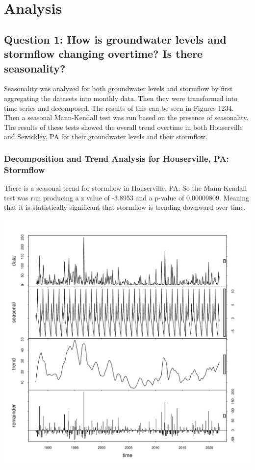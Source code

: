 \documentclass[
  12pt,
]{article}
\begin{document}
\newpage

\hypertarget{analysis}{%
\section{Analysis}\label{analysis}}

\hypertarget{question-1-how-is-groundwater-levels-and-stormflow-changing-overtime-is-there-seasonality}{%
\subsection{Question 1: How is groundwater levels and stormflow changing
overtime? Is there
seasonality?}\label{question-1-how-is-groundwater-levels-and-stormflow-changing-overtime-is-there-seasonality}}

Seasonality was analyzed for both groundwater levels and stormflow by
first aggregating the datasets into monthly data. Then they were
transformed into time series and decomposed. The results of this can be
seen in Figures 1234. Then a seasonal Mann-Kendall test was run based on
the presence of seasonality. The results of these tests showed the
overall trend overtime in both Houserville and Sewickley, PA for their
groundwater levels and their stormflow.

\hypertarget{decomposition-and-trend-analysis-for-houserville-pa-stormflow}{%
\subsubsection{Decomposition and Trend Analysis for Houserville, PA:
Stormflow}\label{decomposition-and-trend-analysis-for-houserville-pa-stormflow}}

There is a seasonal trend for stormflow in Houserville, PA. So the
Mann-Kendall test was run producing a z value of -3.8953 and a p-value
of 0.00009809. Meaning that it is statistically significant that
stormflow is trending downward over time.

\includegraphics{Elliott_WDA_Project_files/figure-latex/seasonality-1.pdf}
\end{document}
